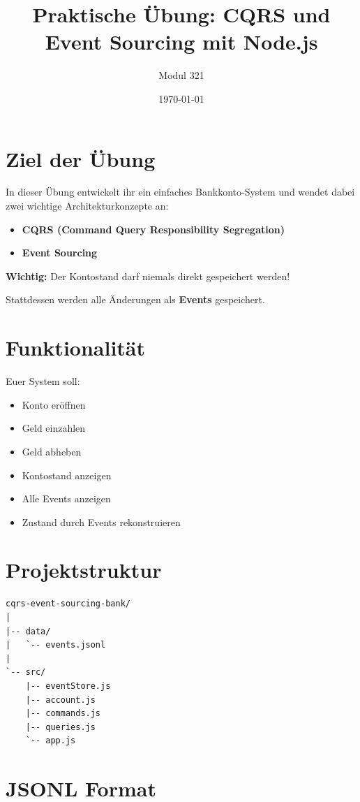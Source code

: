 \documentclass[a4paper,12pt]{article}
\title{Praktische Übung: CQRS und Event Sourcing mit Node.js}
\author{Modul 321}
\date{\today}
\begin{document}
\maketitle

\section*{Ziel der Übung}

In dieser Übung entwickelt ihr ein einfaches Bankkonto-System und wendet dabei zwei wichtige Architekturkonzepte an:

\begin{itemize}
\item \textbf{CQRS (Command Query Responsibility Segregation)}
\item \textbf{Event Sourcing}
\end{itemize}

\textbf{Wichtig:} Der Kontostand darf niemals direkt gespeichert werden!

Stattdessen werden alle Änderungen als \textbf{Events} gespeichert.

\section*{Funktionalität}

Euer System soll:

\begin{itemize}
\item Konto eröffnen
\item Geld einzahlen
\item Geld abheben
\item Kontostand anzeigen
\item Alle Events anzeigen
\item Zustand durch Events rekonstruieren
\end{itemize}

\section*{Projektstruktur}

\begin{lstlisting}
cqrs-event-sourcing-bank/
|
|-- data/
|   `-- events.jsonl
|
`-- src/
    |-- eventStore.js
    |-- account.js
    |-- commands.js
    |-- queries.js
    `-- app.js
\end{lstlisting}

\section*{JSONL Format}
\end{document}
